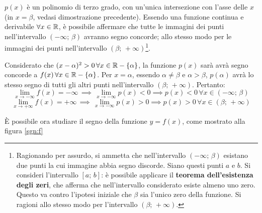 \documentclass[a4paper, oneside, titlepage, reqno]{book}
\begin{document}
$p(x)$ è un polinomio di terzo grado, con un'unica intersezione con l'asse delle $x$ (in $x=\beta$, vedasi dimostrazione precedente). Essendo una funzione continua e derivabile $\forall x\in\mathbb{R}$, è possibile affermare che tutte le immagini dei punti nell'intervallo $(-\infty; \,\beta)$ avranno segno concorde; allo stesso modo per le immagini dei punti nell'intervallo $(\beta; \,+\infty)$\footnote{Ragionando per assurdo, si ammetta che nell'intervallo $(-\infty; \,\beta)$ esistano due punti la cui immagine abbia segno discorde. Siano questi punti $a$ e $b$. Si consideri l'intervallo $[a;\,b]$: è possibile applicare il \textbf{teorema dell'esistenza degli zeri}, che afferma che nell'intervallo considerato esiste almeno uno zero. Questo va contro l'ipotesi iniziale che $\beta$ sia l'unico zero della funzione. Si ragioni allo stesso modo per l'intervallo $(\beta; \,+\infty)$.}.

Considerato che $(x-\alpha)^2>0\,\forall x\in \mathbb{R}-\{\alpha\}$, la funzione $p(x)$ sarà avrà segno concorde a $f(x)\,\forall x\in \mathbb{R}-\{\alpha\}$. Per $x=\alpha$, essendo $\alpha\neq\beta$ e $\alpha>\beta$, $p(\alpha)$ avrà lo stesso segno di tutti gli altri punti nell'intervallo $(\beta; \,+\infty)$. Pertanto:
\[
\lim_{x\to-\infty}f(x)=-\infty\,\implies\,\lim_{x\to-\infty}p(x)<0\implies p(x)<0\,\forall x\in (-\infty;\,\beta)
\]
\[
\lim_{x\to+\infty}f(x)=+\infty\,\implies\,\lim_{x\to-\infty}p(x)>0\implies p(x)>0\,\forall x\in(\beta; \,+\infty)
\]

È possibile ora {studiare il segno} della funzione $y=f(x)$, come mostrato alla figura \ref{sgn:f}
\begin{figure}
\end{figure}
\end{document}

